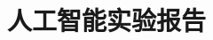 \documentclass[a4paper]{ctexrep}
\title{人工智能实验报告}
\begin{document}


	
\tableofcontents %
\pagebreak




%
\pagestyle{fancy}
\lhead{}%
\rhead{}
\lfoot{}%
\cfoot{\thepage}%
\rfoot{}%
\renewcommand{\headrulewidth}{0.2pt}
\renewcommand{\footrulewidth}{0.4pt}


\end{document}
